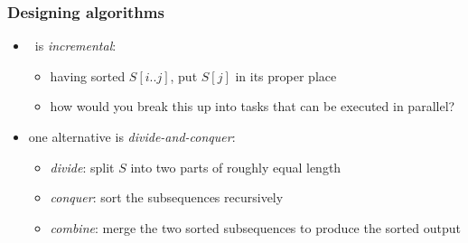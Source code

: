 \begin{frame}[fragile]
%
  \frametitle{Designing algorithms}
%
  \begin{itemize}
%
  \item \insertionsort\ is {\em incremental}:
    \begin{itemize}
      \item having sorted $S[i..j]$, put $S[j]$ in its proper place
      \item how would you break this up into tasks that can be executed in parallel?
    \end{itemize}
%
  \item one alternative is {\em divide-and-conquer}: \mergesort
    \begin{itemize}
      \item {\em divide}: split $S$ into two parts of roughly equal length
      \item {\em conquer}: sort the subsequences recursively
      \item {\em combine}: merge the two sorted subsequences to produce the sorted output
    \end{itemize}
%
  \end{itemize}
%
\end{frame}

